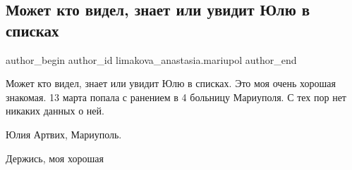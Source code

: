  
 
 
 
 

\subsection{Может кто видел, знает или увидит Юлю в списках}
\label{sec:27_03_2022.fb.limakova_anastasia.mariupol.1.mozhet_kto_videl__zn}

\ifcmt
 author_begin
   author_id limakova_anastasia.mariupol
 author_end
\fi

Может кто видел, знает или увидит Юлю в списках. Это моя очень хорошая
знакомая. 13 марта попала с ранением в 4 больницу Мариуполя. С тех пор нет
никаких данных о ней. 

Юлия Артвих, Мариуполь.🙏

Держись, моя хорошая🙏
